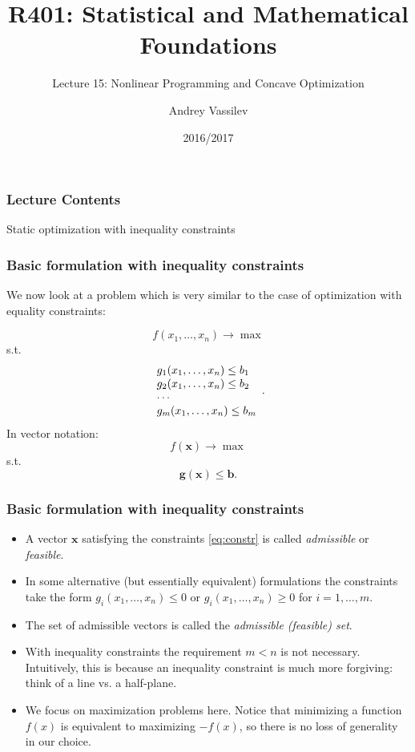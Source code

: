 \documentclass[10pt]{beamer}
\title{R401: Statistical and Mathematical Foundations}
\subtitle{Lecture 15: Nonlinear Programming and Concave Optimization}
\author{Andrey Vassilev}
\date{2016/2017}
\theoremstyle{definition}
\begin{document}
\maketitle



\begin{frame}[fragile]
\frametitle{Lecture Contents}
\tableofcontents
\end{frame}

\begin{section}{Static optimization with inequality constraints}\label{sec:ineq}

\begin{frame}[fragile]
\frametitle{Basic formulation with inequality constraints}
We now look at a problem which is very similar to the case of optimization with equality constraints:

\begin{equation}
f(x_1,\ldots,x_n)\rightarrow \max 
\label{eq:obj}
\end{equation}
s.t.
\begin{equation}
\begin{array}{l l l}
g_1(x_1,\ldots,x_n) \leq b_1\\
g_2(x_1,\ldots,x_n) \leq b_2\\
\cdots \\
g_m(x_1,\ldots,x_n) \leq b_m\\
\end{array}.
\label{eq:constr}
\end{equation}
In vector notation:
\[ f(\mathbf{x}) \rightarrow \max \]
s.t. \[ \mathbf{g}(\mathbf{x})\leq \mathbf{b}. \]
\end{frame}

\begin{frame}[fragile]
\frametitle{Basic formulation with inequality constraints}
\begin{itemize}
\item A vector $ \mathbf{x} $ satisfying the constraints \eqref{eq:constr} is called \emph{admissible} or \emph{feasible}.\bigskip
\item In some alternative (but essentially equivalent) formulations the constraints take the form
$ g_i(x_1,\ldots,x_n)\leq 0 $ or $ g_i(x_1,\ldots,x_n)\geq 0 $ for $ i=1,\ldots,m $.\bigskip
\item The set of admissible vectors is called the \emph{admissible (feasible) set}.\bigskip
\item With inequality constraints the requirement $ m<n $ is not necessary. Intuitively, this is because an inequality constraint is much more forgiving: think of a line vs. a half-plane.\bigskip
\item We focus on maximization problems here. Notice that minimizing a function $ f(x) $ is equivalent to maximizing $ -f(x) $, so there is no loss of generality in our choice.
\end{itemize}
\end{frame}


\end{section}
\end{document}
